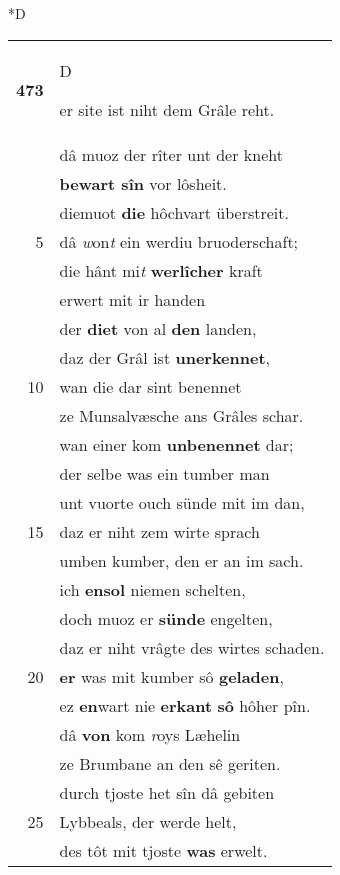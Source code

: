 \documentclass[8pt,a4paper,notitlepage]{article}
\begin{document}
\begin{table}[ht]
\begin{minipage}[t]{0.5\linewidth}
\small
\begin{center}*D
\end{center}
\begin{tabular}{rl}
\textbf{473} & \begin{large}D\end{large}er site ist niht dem Grâle reht.\\ 
 & dâ muoz der rîter unt der kneht\\ 
 & \textbf{bewart sîn} vor lôsheit.\\ 
 & diemuot \textbf{die} hôchvart überstreit.\\ 
5 & dâ \textit{w}on\textit{t} ein werdiu bruoderschaft;\\ 
 & die hânt mi\textit{t} \textbf{werlîcher} kraft\\ 
 & erwert mit ir handen\\ 
 & der \textbf{diet} von al \textbf{den} landen,\\ 
 & daz der Grâl ist \textbf{unerkennet},\\ 
10 & wan die dar sint benennet\\ 
 & ze Munsalvæsche ans Grâles schar.\\ 
 & wan einer kom \textbf{unbenennet} dar;\\ 
 & der selbe was ein tumber man\\ 
 & unt vuorte ouch sünde mit im dan,\\ 
15 & daz er niht zem wirte sprach\\ 
 & umben kumber, den er an im sach.\\ 
 & ich \textbf{en}\textbf{sol} niemen schelten,\\ 
 & doch muoz er \textbf{sünde} engelten,\\ 
 & daz er niht vrâgte des wirtes schaden.\\ 
20 & \textbf{er} was mit kumber sô \textbf{geladen},\\ 
 & ez \textbf{en}wart nie \textbf{erkant} \textbf{sô} hôher pîn.\\ 
 & dâ \textbf{von} kom \textit{r}oys Læhelin\\ 
 & ze Brumbane an den sê geriten.\\ 
 & durch tjoste het sîn dâ gebiten\\ 
25 & Lybbeals, der werde helt,\\ 
 & des tôt mit tjoste \textbf{was} erwelt.\\ 

\end{tabular}
\end{minipage}
\end{table}
\end{document}
